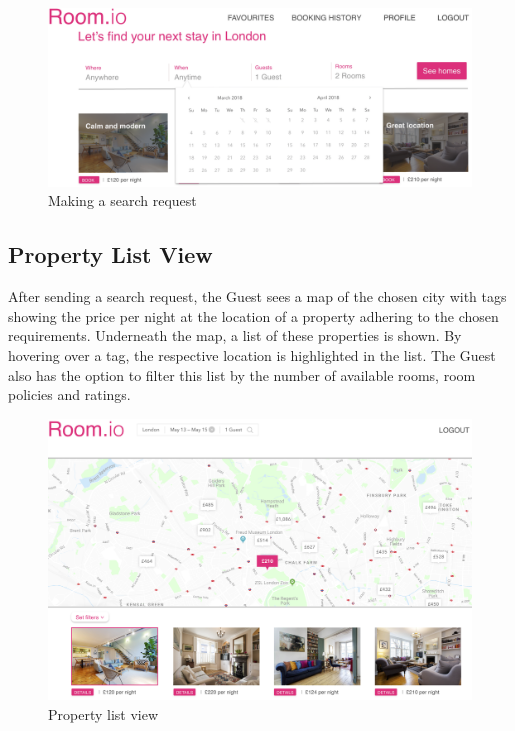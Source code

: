 \begin{figure}[H]
  \centering
  \includegraphics[width=\textwidth]{img/mockups/guest_search.png}
  \caption{Making a search request}
  \label{Search_View}
\end{figure}

\subsection{Property List View}
After sending a search request, the Guest sees a map of the chosen city with tags showing the price per night at the location of a property adhering to the chosen requirements. Underneath the map, a list of these properties is shown. By hovering over a tag, the respective location is highlighted in the list. The Guest also has the option to filter this list by the number of available rooms, room policies and ratings.

\begin{figure}[H]
  \centering
  \includegraphics[width=17cm]{img/mockups/guest_propertyList.png}
  \caption{Property list view}
  \label{Property_List_View}
\end{figure}

